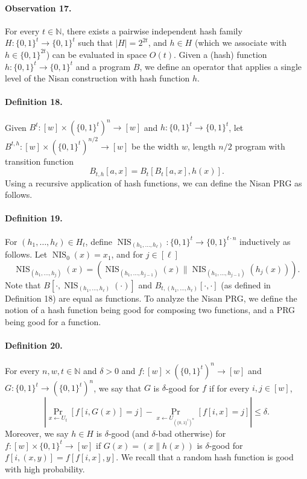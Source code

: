 \paragraph{Observation 17.} For every $t\in\mathbb N$, there exists a pairwise independent hash family $H:\{0,1\}^t\to\{0,1\}^t$ such that $|H|=2^{2t}$, and $h\in H$ (which we associate with $h\in\{0,1\}^{2t}$) can be evaluated in space $O(t)$.
Given a (hash) function $h:\{0,1\}^t\to\{0,1\}^t$ and a program $B$, we define an operator that applies a single level of the Nisan construction with hash function $h$.
\paragraph{Definition 18.} Given $B^t:[w]\times(\{0,1\}^t)^n\to[w]$ and $h:\{0,1\}^t\to\{0,1\}^t$, let $B^{t,h}:[w]\times(\{0,1\}^t)^{n/2}\to[w]$ be the width $w$, length $n/2$ program with transition function
\[B_{t,h}[a,x]=B_t[B_t[a,x],h(x)].\]
Using a recursive application of hash functions, we can define the Nisan PRG as follows.
\paragraph{Definition 19.} For $(h_1,\ldots,h_\ell)\in H_t$, define $\operatorname{NIS}_{(h_1,\ldots,h_\ell)}:\{0,1\}^t\to\{0,1\}^{t\cdot n}$ inductively as follows. Let $\operatorname{NIS}_0(x)=x_1$, and for $j\in[\ell]$
\[\operatorname{NIS}_{(h_1,\ldots,h_j)}(x)=(\operatorname{NIS}_{(h_1,\ldots,h_{j-1})}(x)\|\operatorname{NIS}_{(h_1,\ldots,h_{j-1})}(h_j(x))).\]
Note that $B[\cdot,\operatorname{NIS}_{(h_1,\ldots,h_\ell)}(\cdot)]$ and $B_{t,(h_1,\ldots,h_\ell)}[\cdot,\cdot]$ (as defined in Definition 18) are equal as functions.
To analyze the Nisan PRG, we define the notion of a hash function being good for composing two functions, and a PRG being good for a function.
\paragraph{Definition 20.} For every $n,w,t\in\mathbb N$ and $\delta>0$ and $f:[w]\times(\{0,1\}^t)^n\to[w]$ and $G:\{0,1\}^t\to(\{0,1\}^t)^n$, we say that $G$ is $\delta$-good for $f$ if for every $i,j\in[w]$,
\[\left|\Pr_{x\leftarrow U_t}[f[i,G(x)]=j]-\Pr_{x\leftarrow U_{(\{0,1\}^t)^n}}[f[i,x]=j]\right|\leq\delta.\]
Moreover, we say $h\in H$ is $\delta$-good (and $\delta$-bad otherwise) for $f:[w]\times\{0,1\}^t\to[w]$ if $G(x)=(x\|h(x))$ is $\delta$-good for $f[i,(x,y)]=f[f[i,x],y]$.
We recall that a random hash function is good with high probability.
